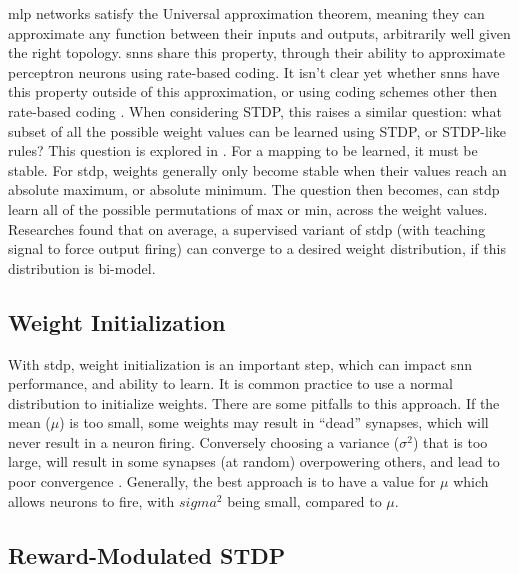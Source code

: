    \Gls{mlp} networks satisfy the Universal approximation theorem, meaning they
    can approximate any function between their inputs and outputs, arbitrarily
    well given the right topology. \Glspl{snn} share this property, through
    their ability to approximate perceptron neurons using rate-based coding. It
    isn't clear yet whether \Glspl{snn} have this property outside of this
    approximation, or using coding schemes other then rate-based coding
    \parencite{legenstein_2005}. When considering STDP, this raises a similar
    question: what subset of all the possible weight values can be learned using
    STDP, or STDP-like rules? This question is explored in
    \parencite{legenstein_2005}. For a mapping to be learned, it must be
    stable. For \gls{stdp}, weights generally only become stable when their
    values reach an absolute maximum, or absolute minimum. The question then
    becomes, can \gls{stdp} learn all of the possible permutations of max or
    min, across the weight values. Researches found that on average, a
    supervised variant of \Gls{stdp} (with teaching signal to force output
    firing) can converge to a desired weight distribution, if this distribution
    is bi-model.

    \subsection{Weight Initialization}
    
    With \Gls{stdp}, weight initialization is an important step, which can
    impact \Gls{snn} performance, and ability to learn. It is common practice to
    use a normal distribution to initialize weights. There are some pitfalls to
    this approach. If the mean ($\mu$) is too small, some weights may result in
    ``dead'' synapses, which will never result in a neuron firing. Conversely
    choosing a variance ($\sigma^2$) that is too large, will result in some
    synapses (at random) overpowering others, and lead to poor convergence
    \parencite{vigneron_2020}. Generally, the best approach is to have a value for
    $\mu$ which allows neurons to fire, with $sigma^2$ being small, compared to
    $\mu$.

    \subsection{Reward-Modulated STDP}
    
